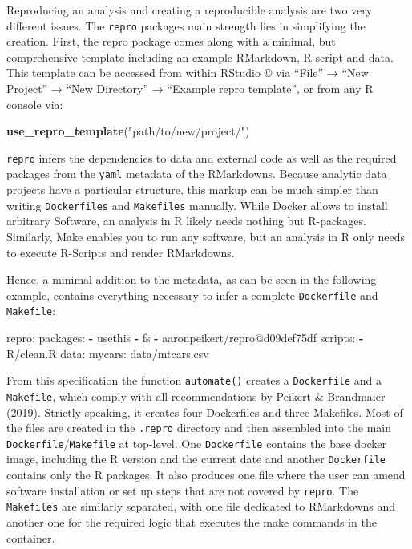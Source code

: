 \documentclass[12pt,a4paper,twoside]{article}
\newenvironment{Shaded}{\begin{snugshade}}{\end{snugshade}}
\newcommand{\AttributeTok}[1]{\textcolor[rgb]{0.77,0.63,0.00}{#1}}
\newcommand{\FunctionTok}[1]{\textcolor[rgb]{0.00,0.00,0.00}{#1}}
\newcommand{\KeywordTok}[1]{\textcolor[rgb]{0.13,0.29,0.53}{\textbf{#1}}}
\newcommand{\NormalTok}[1]{#1}
\newcommand{\StringTok}[1]{\textcolor[rgb]{0.31,0.60,0.02}{#1}}
\begin{document}
Reproducing an analysis and creating a reproducible analysis are two very different issues.
The \texttt{repro} packages main strength lies in simplifying the creation.
First, the repro package comes along with a minimal, but comprehensive template including an example RMarkdown, R-script and data.
This template can be accessed from within RStudio © via ``File'' → ``New Project'' → ``New Directory'' → ``Example repro template'', or from any R console via:

\begin{Shaded}
\begin{Highlighting}[]
\KeywordTok{use_repro_template}\NormalTok{(}\StringTok{"path/to/new/project/"}\NormalTok{)}
\end{Highlighting}
\end{Shaded}

\texttt{repro} infers the dependencies to data and external code as well as the required packages from the \texttt{yaml} metadata of the RMarkdowns.
Because analytic data projects have a particular structure, this markup can be much simpler than writing \texttt{Dockerfiles} and \texttt{Makefiles} manually.
While Docker allows to install arbitrary Software, an analysis in R likely needs nothing but R-packages. Similarly, Make enables you to run any software, but an analysis in R only needs to execute R-Scripts and render RMarkdowns.

Hence, a minimal addition to the metadata, as can be seen in the following example, contains everything necessary to infer a complete \texttt{Dockerfile} and \texttt{Makefile}:

\begin{Shaded}
\begin{Highlighting}[]
\FunctionTok{repro:}
  \FunctionTok{packages:}
    \KeywordTok{-}\NormalTok{ usethis}
    \KeywordTok{-}\NormalTok{ fs}
    \KeywordTok{-}\NormalTok{ aaronpeikert/repro@d09def75df}
  \FunctionTok{scripts:}
    \KeywordTok{-}\NormalTok{ R/clean.R}
  \FunctionTok{data:}
    \FunctionTok{mycars:}\AttributeTok{ data/mtcars.csv}
\end{Highlighting}
\end{Shaded}

From this specification the function \texttt{automate()} creates a \texttt{Dockerfile} and a \texttt{Makefile}, which comply with all recommendations by Peikert \& Brandmaier (\protect\hyperlink{ref-peikertReproducibleDataAnalysis2019}{2019}).
Strictly speaking, it creates four Dockerfiles and three Makefiles.
Most of the files are created in the \texttt{.repro} directory and then assembled into the main \texttt{Dockerfile}/\texttt{Makefile} at top-level.
One \texttt{Dockerfile} contains the base docker image, including the R version and the current date and another \texttt{Dockerfile} contains only the R packages.
It also produces one file where the user can amend software installation or set up steps that are not covered by \texttt{repro}.
The \texttt{Makefiles} are similarly separated, with one file dedicated to RMarkdowns and another one for the required logic that executes the make commands in the container.
\end{document}
